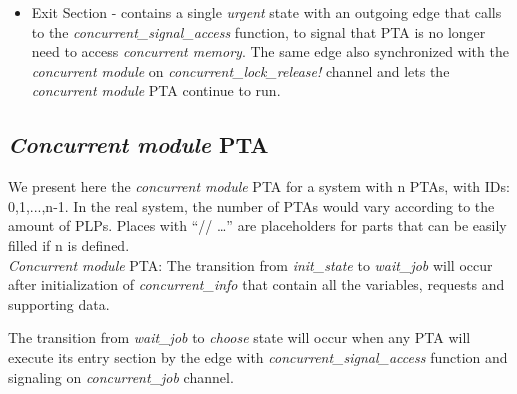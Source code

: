 \begin{itemize}
\item Exit Section - contains a single \textit{urgent} state with an outgoing edge that calls to the \textcolor{ColorUppaalFunction}{\textit{concurrent_signal_access}} function, to signal that PTA is no longer need to access \textit{concurrent memory}. The same edge also synchronized with the \textit{concurrent module} on \textcolor{ColorUppaalChannel}{\textit{concurrent_lock_release!}} channel and lets the \textit{concurrent module} PTA continue to run.
\end{itemize}
\subsection{\textit{Concurrent module} PTA}
We present here the \textit{concurrent module} PTA for a system with n PTAs, with IDs: 0,1,...,n-1. In the real system, the number of PTAs would vary according to the amount of PLPs. Places with “// …” are placeholders for parts that can be easily filled if n is defined. \\
\textit{Concurrent module} PTA:  The transition from \textcolor{ColorUppaalState}{\textit{init_state}} to \textcolor{ColorUppaalState}{\textit{wait_job}} will occur after initialization of \textcolor{ColorEdgeUpdate}{\textit{concurrent_info}} that contain all the variables, requests and supporting data. 
\par The transition from \textcolor{ColorUppaalState}{\textit{wait_job}} to \textcolor{ColorUppaalState}{\textit{choose}} state will occur when any PTA will execute its entry section by the edge with \textcolor{ColorUppaalFunction}{\textit{concurrent_signal_access}} function and signaling on \textcolor{ColorUppaalChannel}{\textit{concurrent_job}} channel ​. 
